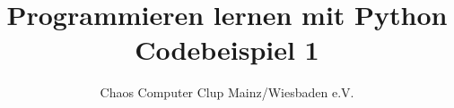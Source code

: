 



	\title{Programmieren lernen mit Python\\Codebeispiel 1}
	\author{Chaos Computer Clup Mainz/Wiesbaden e.V.}
	\maketitle
	
	\section*{}
	
	\lstset{numbers=left}
	
	
